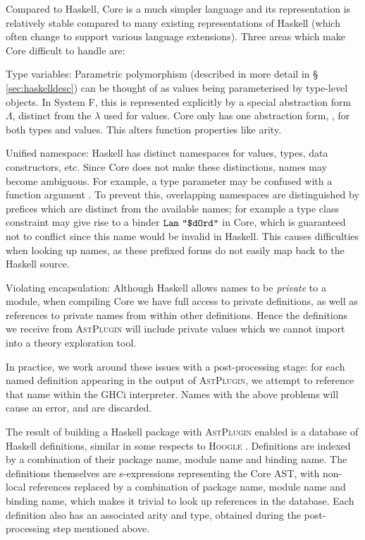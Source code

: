 Compared to Haskell, Core is a much simpler language and its representation is
relatively stable compared to many existing representations of Haskell (which
often change to support various language extensions). Three areas which make
Core difficult to handle are:

\begin{description}
\item{Type variables}: Parametric polymorphism (described in more detail in \S
  \ref{sec:haskelldesc}) can be thought of as values being parameterised by
  type-level objects. In System F, this is represented explicitly by a special
  abstraction form $\Lambda$, distinct from the $\lambda$ used for values. Core
  only has one abstraction form, \CLam, for both types and values. This alters
  function properties like arity.

\item{Unified namespace}: Haskell has distinct namespaces for values, types,
  data constructors, etc. Since Core does not make these distinctions, names may
  become ambiguous. For example, a type parameter  may be confused with a
  function argument . To prevent this, overlapping namespaces are
  distinguished by prefices which are distinct from the available names; for
  example a type class constraint  may give rise to a binder
  $\texttt{Lam}\ \texttt{"\$dOrd"}$ in Core, which is guaranteed not to conflict since this
  name would be invalid in Haskell. This causes difficulties when looking up
  names, as these prefixed forms do not easily map back to the Haskell source.

\item{Violating encapsulation}: Although Haskell allows names to be
  \emph{private} to a module, when compiling Core we have full access to private
  definitions, as well as references to private names from within other
  definitions. Hence the definitions we receive from \textsc{AstPlugin} will
  include private values which we cannot import into a theory exploration tool.
\end{description}

In practice, we work around these issues with a post-processing stage: for each
named definition appearing in the output of \textsc{AstPlugin}, we attempt to
reference that name within the GHCi interpreter. Names with the above problems
will cause an error, and are discarded.

The result of building a Haskell package with \textsc{AstPlugin} enabled is a
database of Haskell definitions, similar in some respects to \textsc{Hoogle}
\cite{mitchell2008hoogle}. Definitions are indexed by a combination of their
package name, module name and binding name. The definitions themselves are
s-expressions representing the Core AST, with non-local references replaced by a
combination of package name, module name and binding name, which makes it
trivial to look up references in the database. Each definition also has an
associated arity and type, obtained during the post-processing step mentioned
above.

